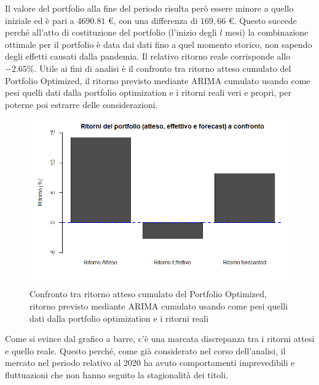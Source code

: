 \documentclass[12pt]{article}
\begin{document}
\FloatBarrier
Il valore del portfolio alla fine del periodo risulta però essere minore a quello iniziale ed è pari a $4690.81$ €, con una differenza di $169,66$ €. Questo succede perché all'atto di costituzione del portfolio (l'inizio degli $l$ mesi) la combinazione ottimale per il portfolio è data dai dati fino a quel momento storico, non sapendo degli effetti causati dalla pandemia. Il relativo ritorno reale corrisponde allo $-2.65\%$. Utile ai fini di analisi è il confronto tra ritorno atteso cumulato del Portfolio Optimized, il ritorno previsto mediante ARIMA cumulato usando come pesi quelli dati dalla portfolio optimization e i ritorni reali veri e propri, per poterne poi estrarre delle considerazioni.
\begin{figure}[!htb]
    \centering
    \includegraphics[width=1\textwidth]{immagini/confr.png}
    \caption{Confronto tra ritorno atteso cumulato del Portfolio Optimized, ritorno previsto mediante ARIMA cumulato usando come pesi quelli dati dalla portfolio optimization e i ritorni reali}
\end{figure}
\FloatBarrier
Come si evince dal grafico a barre, c'è una marcata discrepanza tra i ritorni attesi e quello reale. Questo perché, come già considerato nel corso dell'analisi, il mercato nel periodo relativo al 2020 ha avuto comportamenti imprevedibili e fluttuazioni che non hanno seguito la stagionalità dei titoli.
\newpage
\end{document}
